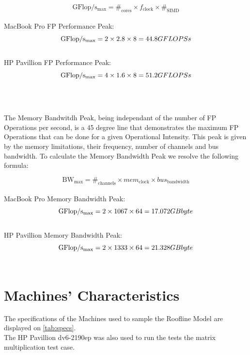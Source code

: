 \documentclass[twoside]{article}
\begin{document}
\begin{multicols}{2}
$$\mathrm{GFlop/s_{max}} =  \#_{\mathrm{cores}} \times f_{\mathrm{clock}} \times \#_{\mathrm{SIMD}}$$\\
MacBook Pro FP Performance Peak:
$$\mathrm{GFlop/s_{max}} =  2 \times 2.8 \times 8
						 =  44.8 GFLOPS\\s$$\\
HP Pavillion FP Performance Peak:
$$\mathrm{GFlop/s_{max}} =  4 \times 1.6 \times 8
						 =  51.2 GFLOPS\\s$$\\
\\
\\
The Memory Bandwitdh Peak, being independant of the number of FP Operations per second, is a 45 degree line that demonstrates the maximum FP Operations that can be done for a given Operational Intensity. This peak is given by the memory limitations, their frequency, number of channels and bus bandwidth.
To calculate the Memory Bandwidth Peak we resolve the following formula:

$$\mathrm{BW_{max}} =  \#_{\mathrm{channels}} \times mem_{\mathrm{clock}} \times bus_{\mathrm{bandwidth}}$$\\ 
MacBook Pro Memory Bandwidth Peak:
$$\mathrm{GFlop/s_{max}} =  2 \times 1067 \times 64
						 =  17.072 GB\\byte$$\\
HP Pavillion Memory Bandwidth Peak:
$$\mathrm{GFlop/s_{max}} =  2 \times 1333 \times 64
						 =  21.328 GB\\byte$$\\


\section{Machines' Characteristics}

The specifications of the Machines used to sample the Roofline Model are displayed on \autoref{tab:specs}. \\The HP Pavillion dv6-2190ep was also used to run the tests the matrix multiplication test case. \\


\end{multicols}
\end{document}
